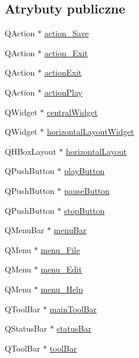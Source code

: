 \subsection*{Atrybuty publiczne}
\begin{DoxyCompactItemize}
\item 
Q\-Action $\ast$ \hyperlink{class_ui___d_main_window_a7ab98279e07bdd724a091ea06012c87b}{action\-\_\-\-Save}
\item 
Q\-Action $\ast$ \hyperlink{class_ui___d_main_window_a00e6b795743b676bdf3ed853e91f7029}{action\-\_\-\-Exit}
\item 
Q\-Action $\ast$ \hyperlink{class_ui___d_main_window_ae1fa62a4d27fa0f4a5c63c7c60cfdad2}{action\-Exit}
\item 
Q\-Action $\ast$ \hyperlink{class_ui___d_main_window_a6cfb6311ca1dd6e247d80255e2667ba7}{action\-Play}
\item 
Q\-Widget $\ast$ \hyperlink{class_ui___d_main_window_a94cf40cb4e645cfa2e80f36ffbf5018e}{central\-Widget}
\item 
Q\-Widget $\ast$ \hyperlink{class_ui___d_main_window_a777a56f3b74aa5b5cd5ff2c62a2968a9}{horizontal\-Layout\-Widget}
\item 
Q\-H\-Box\-Layout $\ast$ \hyperlink{class_ui___d_main_window_a4ab6ff85d8c5edef531b3f2111a04157}{horizontal\-Layout}
\item 
Q\-Push\-Button $\ast$ \hyperlink{class_ui___d_main_window_ad87cbf39ac14374923ed2a2b11e8b1bf}{play\-Button}
\item 
Q\-Push\-Button $\ast$ \hyperlink{class_ui___d_main_window_a70e142e35db4995a1fefa082406bdef3}{pause\-Button}
\item 
Q\-Push\-Button $\ast$ \hyperlink{class_ui___d_main_window_a1fe7797fff349a0f0d47d90c8438f386}{stop\-Button}
\item 
Q\-Menu\-Bar $\ast$ \hyperlink{class_ui___d_main_window_a788ef749d82ca070e467e55cca0d47dd}{menu\-Bar}
\item 
Q\-Menu $\ast$ \hyperlink{class_ui___d_main_window_a991f4d15852faf04d8c12694b3e077ad}{menu\-\_\-\-File}
\item 
Q\-Menu $\ast$ \hyperlink{class_ui___d_main_window_a8826a3e34a5aa75fca2b8e45b7010a8b}{menu\-\_\-\-Edit}
\item 
Q\-Menu $\ast$ \hyperlink{class_ui___d_main_window_ac2997077098614d72b21d29c7a48350c}{menu\-\_\-\-Help}
\item 
Q\-Tool\-Bar $\ast$ \hyperlink{class_ui___d_main_window_a2e1da3781ee1e5913b25b85f4c29b97f}{main\-Tool\-Bar}
\item 
Q\-Status\-Bar $\ast$ \hyperlink{class_ui___d_main_window_ac9e025e7279839dd7ab1686456d1ae21}{status\-Bar}
\item 
Q\-Tool\-Bar $\ast$ \hyperlink{class_ui___d_main_window_abba1dae1dd835c7a7dd39da623cd4580}{tool\-Bar}
\end{DoxyCompactItemize}


